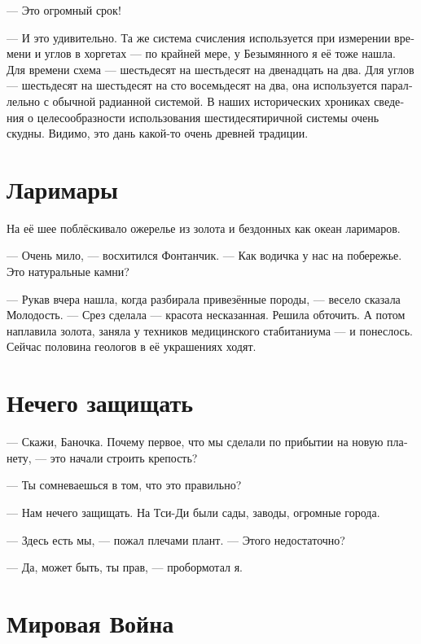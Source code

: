 \documentclass[a4paper,12pt,fleqn]{book}\usepackage{cooltooltips}\usepackage{polyglossia}\setdefaultlanguage[babelshorthands=true]{russian}\setotherlanguage{english}\defaultfontfeatures{Ligatures=TeX,Mapping=tex-text} \usepackage{xcolor}\definecolor{lightgray}{HTML}{bbbbbb}\color{lightgray}\newcommand{\ml}[3]{\textenglish{\textcolor{black}{#3}}}
\begin{document}
{--- Это огромный срок!

--- И это удивительно.
Та же система счисления используется при измерении времени и углов в хоргетах --- по крайней мере, у Безымянного я её тоже нашла.
Для времени схема --- шестьдесят на шестьдесят на двенадцать на два.
Для углов --- шестьдесят на шестьдесят на сто восемьдесят на два, она используется параллельно с обычной радианной системой.
В наших исторических хрониках сведения о целесообразности использования шестидесятиричной системы очень скудны.
Видимо, это дань какой-то очень древней традиции.

\section{Ларимары}

На её шее поблёскивало ожерелье из золота и бездонных как океан ларимаров.

--- Очень мило, --- восхитился Фонтанчик.
--- Как водичка у нас на побережье.
Это натуральные камни?

--- Рукав вчера нашла, когда разбирала привезённые породы, --- весело сказала Молодость.
--- Срез сделала --- красота несказанная.
Решила обточить.
А потом наплавила золота, заняла у техников медицинского стабитаниума --- и понеслось.
Сейчас половина геологов в её украшениях ходят.

\section{Нечего защищать}

--- Скажи, Баночка.
Почему первое, что мы сделали по прибытии на новую планету, --- это начали строить крепость?

--- Ты сомневаешься в том, что это правильно?

--- Нам нечего защищать.
На Тси-Ди были сады, заводы, огромные города.

--- Здесь есть мы, --- пожал плечами плант.
--- Этого недостаточно?

--- Да, может быть, ты прав, --- пробормотал я.

\section{Мировая Война}

}
\end{document}
